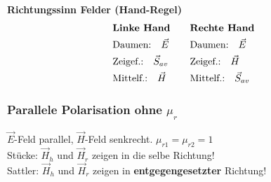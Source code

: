 \textbf{Richtungssinn Felder (Hand-Regel)}
\begin{equation*}
	\begin{aligned}
	& \text{\textbf{Linke Hand}}\\
	& \text{Daumen:}\quad \vec{E}\\
	& \text{Zeigef.:}\quad \vec{S}_{av}\\
	& \text{Mittelf.:}\quad \vec{H} 
	\end{aligned}
	\qquad
	\begin{aligned}
	& \text{\textbf{Rechte Hand}}\\
	& \text{Daumen:}\quad \vec{E}\\
	& \text{Zeigef.:}\quad \vec{H}\\
	& \text{Mittelf.:}\quad \vec{S}_{av}
	\end{aligned}
\end{equation*}
\newcolumn
\subsubsection{Parallele Polarisation ohne $ \mu_r $}
\begin{center}

\end{center}
$\vec{E}$-Feld parallel, $ \vec{H}$-Feld senkrecht. \qquad $ \mu_{r1} = \mu_{r2} =1 $\\

Stücke: $\vec{H}_h$ und $ \vec{H}_r$ zeigen in die selbe Richtung!\\
Sattler: $\vec{H}_h$ und $ \vec{H}_r$ zeigen in \textbf{entgegengesetzter} Richtung!\\

